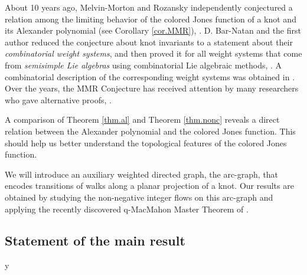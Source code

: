 \documentclass{amsart}
\theoremstyle{plain}
\theoremstyle{definition}
\theoremstyle{remark}
\def\printname#1{
        \if\draft y
                \smash{\makebox[0pt]{\hspace{-0.5in}
                        \raisebox{8pt}{\tt\tiny #1}}}
        \fi
}
\def\lbl#1{\label{#1}\printname{#1}}
\begin{document}
About 10 years ago, Melvin-Morton and Rozansky independently conjectured
a relation among the limiting behavior of the colored Jones function 
of a knot and its Alexander polynomial (see Corollary \ref{cor.MMR}), 
\cite{MM,Ro1,Ro2}. D. Bar-Natan and 
the first author reduced the conjecture about knot invariants to a statement 
about their {\em combinatorial weight systems}, and then proved it for all 
weight systems that come from {\em semisimple Lie algebras} using 
combinatorial 
Lie algebraic methods, \cite{BG}. A combinatorial description of the 
corresponding
weight systems was obtained in \cite{GL}. Over the years, the MMR Conjecture 
has received 
attention by many researchers who gave alternative proofs, 
\cite{Ch,KSA,KM,Ro3,V}.

A comparison of Theorem \ref{thm.al} and Theorem \ref{thm.nonc} reveals a 
direct
relation between the Alexander polynomial and the colored 
Jones function. This should help us better understand the topological features
of the colored Jones function.

We will introduce an auxiliary weighted directed graph, the arc-graph, 
that encodes transitions of walks along a planar projection of a knot.
Our results are obtained by studying the non-negative integer flows on this 
arc-graph
and applying the recently discovered  q-MacMahon Master Theorem of \cite{GLZ}.

\subsection{Statement of the main result}
\lbl{sub.sta}
\end{document}
